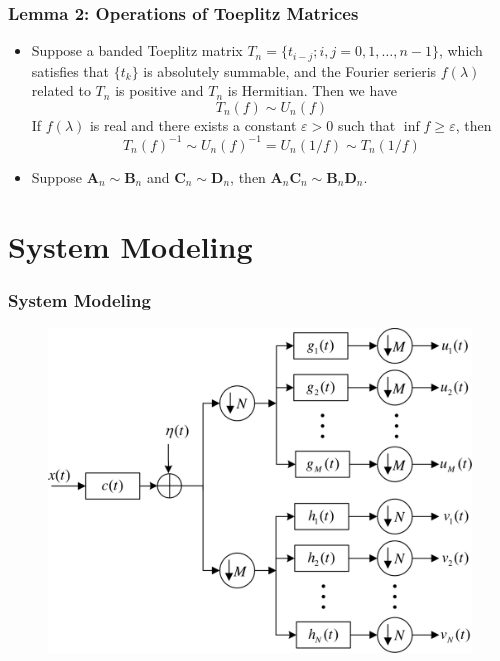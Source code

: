 \documentclass{beamer}
\begin{document}
\begin{frame}
\frametitle{Lemma 2: Operations of Toeplitz Matrices}
\begin{block}{}
  \cite[Lemma 7 and 10]{Gray:2006}
  \label{lemma2}
  \begin{itemize}
    \item Suppose a banded Toeplitz matrix $T_n=\{t_{i-j};i,j=0,1,\dots,n-1\}$, which satisfies that $\{t_k\}$ is absolutely summable, and the Fourier serieris $f(\lambda)$ related to $T_n$ is positive and $T_n$ is Hermitian.
  Then we have
  \begin{equation}
    T_n(f)\sim U_n(f)
  \end{equation}
  If $f(\lambda)$ is real and there exists a constant $\varepsilon>0$ such that $\inf{f}\geq\varepsilon$, then
  \begin{equation}
    T_n(f)^{-1}\sim U_n(f)^{-1}=U_n(1/f)\sim T_n(1/f)
  \end{equation}
\item Suppose $\pmb{A}_n\sim\pmb{B}_n$ and $\pmb{C}_n\sim\pmb{D}_n$, then $\pmb{A}_n\pmb{C}_n\sim\pmb{B}_n\pmb{D}_n$.
  \end{itemize}
\end{block}
\end{frame}



\section{System Modeling}

\begin{frame}
\frametitle{System Modeling}
\begin{figure}
\includegraphics[width=0.7\linewidth]{flowchart1.pdf}
\end{figure}
\end{frame}
\end{document}
